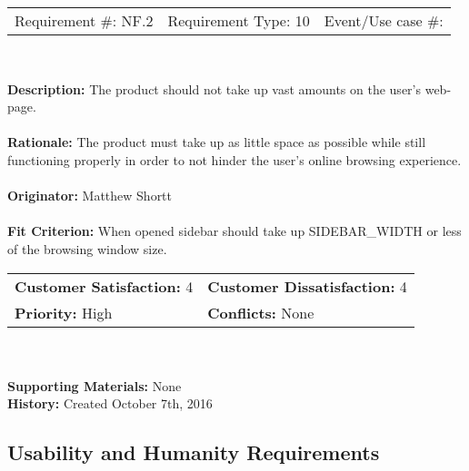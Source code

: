 \documentclass[12pt, titlepage]{article}
\begin{document}
\begin{framed}
	
	\begin{center}
		
		\begin{tabular}{ l c r }
			Requirement \#: NF.2 & Requirement Type: 10 & Event/Use case \#: \\
		\end{tabular} \\
	\end{center}
	\textbf{Description:} The product should not take up vast amounts on the user's 
	web-page.\\
	\\
	\textbf{Rationale:} The product must take up as little space as possible while still 
	functioning properly in order to not hinder the user's online browsing experience.  \\
	\\
	\textbf{Originator:} Matthew Shortt \\
	\\
	\textbf{Fit Criterion:} When opened sidebar should take up SIDEBAR\_WIDTH 
	or less of the browsing window size.
	\\
	
	\begin{tabular}{ll}
		\textbf{Customer Satisfaction:} 4 & \textbf{Customer Dissatisfaction:} 4 \\
		\textbf{Priority:} High & \textbf{Conflicts:} None\\
	\end{tabular} \\
	\\
	\textbf{Supporting Materials:} None \\
	\textbf{History:} Created October 7th, 2016
	
\end{framed}

\subsection{Usability and Humanity Requirements}
\end{document}
